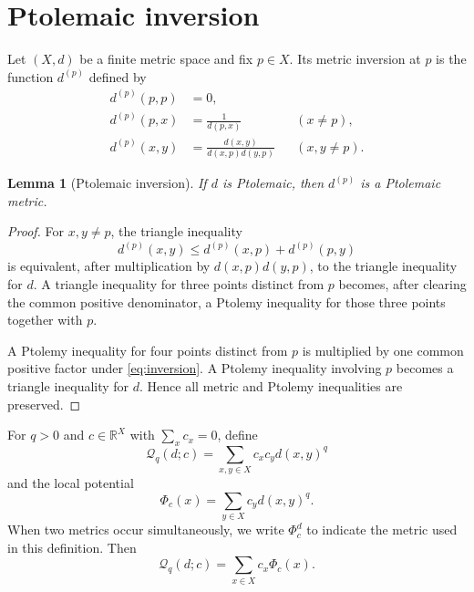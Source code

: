 \documentclass[11pt]{amsart}
\newtheorem{lemma}[lemma]{Lemma}
\theoremstyle{definition}
\theoremstyle{remark}
\newcommand{\R}{\mathbb R}
\newcommand{\Qform}{\mathcal Q}
\begin{document}
\section{Ptolemaic inversion}

Let $(X,d)$ be a finite metric space and fix $p\in X$.  Its metric
inversion at $p$ is the function $d^{(p)}$ defined by
\begin{equation}\label{eq:inversion}
 \begin{aligned}
 d^{(p)}(p,p)&=0,\\
 d^{(p)}(p,x)&=\frac1{d(p,x)} &&(x\ne p),\\
 d^{(p)}(x,y)&=\frac{d(x,y)}{d(x,p)d(y,p)} &&(x,y\ne p).
 \end{aligned}
\end{equation}

\begin{lemma}[Ptolemaic inversion]\label{lem:ptolemy-inversion}
If $d$ is Ptolemaic, then $d^{(p)}$ is a Ptolemaic metric.
\end{lemma}

\begin{proof}
For $x,y\ne p$, the triangle inequality
\[
 d^{(p)}(x,y)\le d^{(p)}(x,p)+d^{(p)}(p,y)
\]
is equivalent, after multiplication by $d(x,p)d(y,p)$, to the triangle
inequality for $d$.  A triangle inequality for three points distinct from
$p$ becomes, after clearing the common positive denominator, a Ptolemy
inequality for those three points together with $p$.

A Ptolemy inequality for four points distinct from $p$ is multiplied by one
common positive factor under \eqref{eq:inversion}.  A Ptolemy inequality
involving $p$ becomes a triangle inequality for $d$.  Hence all metric and
Ptolemy inequalities are preserved.
\end{proof}

For $q>0$ and $c\in\R^X$ with $\sum_xc_x=0$, define
\begin{equation}\label{eq:quadratic-form}
 \Qform_q(d;c)=\sum_{x,y\in X}c_xc_y d(x,y)^q
\end{equation}
and the local potential
\begin{equation}\label{eq:potential}
 \Phi_c(x)=\sum_{y\in X}c_y d(x,y)^q.
\end{equation}
When two metrics occur simultaneously, we write $\Phi_c^d$ to indicate
the metric used in this definition.  Then
\begin{equation}\label{eq:potential-sum}
 \Qform_q(d;c)=\sum_{x\in X}c_x\Phi_c(x).
\end{equation}
\end{document}
